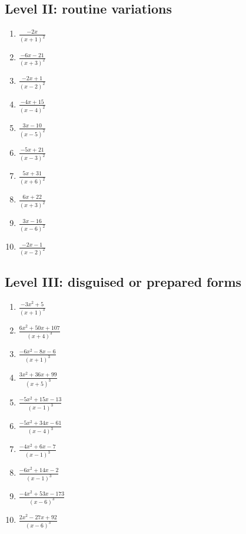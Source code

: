 \documentclass[11pt,oneside]{book}
\begin{document}
\subsection*{Level II: routine variations}
\begin{enumerate}[leftmargin=*,label=\textbf{\arabic*.},itemsep=0.65\baselineskip]
\item $\displaystyle \frac{- 2 x}{\left(x + 1\right)^{2}}$
\item $\displaystyle \frac{- 6 x - 21}{\left(x + 3\right)^{2}}$
\item $\displaystyle \frac{- 2 x + 1}{\left(x - 2\right)^{2}}$
\item $\displaystyle \frac{- 4 x + 15}{\left(x - 4\right)^{2}}$
\item $\displaystyle \frac{3 x - 10}{\left(x - 5\right)^{2}}$
\item $\displaystyle \frac{- 5 x + 21}{\left(x - 3\right)^{2}}$
\item $\displaystyle \frac{5 x + 31}{\left(x + 6\right)^{2}}$
\item $\displaystyle \frac{6 x + 22}{\left(x + 3\right)^{2}}$
\item $\displaystyle \frac{3 x - 16}{\left(x - 6\right)^{2}}$
\item $\displaystyle \frac{- 2 x - 1}{\left(x - 2\right)^{2}}$
\end{enumerate}
\subsection*{Level III: disguised or prepared forms}
\begin{enumerate}[leftmargin=*,label=\textbf{\arabic*.},itemsep=0.65\baselineskip]
\item $\displaystyle \frac{- 3 x^{2} + 5}{\left(x + 1\right)^{3}}$
\item $\displaystyle \frac{6 x^{2} + 50 x + 107}{\left(x + 4\right)^{3}}$
\item $\displaystyle \frac{- 6 x^{2} - 8 x - 6}{\left(x + 1\right)^{3}}$
\item $\displaystyle \frac{3 x^{2} + 36 x + 99}{\left(x + 5\right)^{3}}$
\item $\displaystyle \frac{- 5 x^{2} + 15 x - 13}{\left(x - 1\right)^{3}}$
\item $\displaystyle \frac{- 5 x^{2} + 34 x - 61}{\left(x - 4\right)^{3}}$
\item $\displaystyle \frac{- 4 x^{2} + 6 x - 7}{\left(x - 1\right)^{3}}$
\item $\displaystyle \frac{- 6 x^{2} + 14 x - 2}{\left(x - 1\right)^{3}}$
\item $\displaystyle \frac{- 4 x^{2} + 53 x - 173}{\left(x - 6\right)^{3}}$
\item $\displaystyle \frac{2 x^{2} - 27 x + 92}{\left(x - 6\right)^{3}}$
\end{enumerate}
\end{document}
